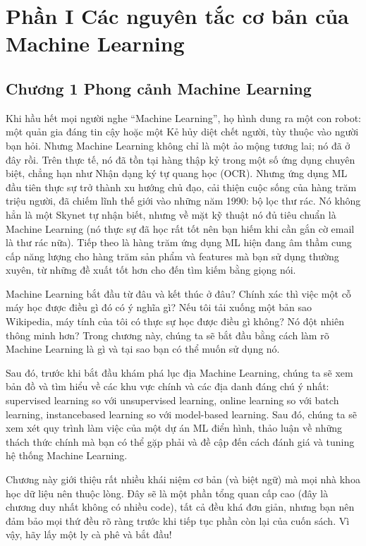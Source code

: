 \section{Phần I Các nguyên tắc cơ bản của Machine Learning}

\subsection{Chương 1 Phong cảnh Machine Learning}

Khi hầu hết mọi người nghe “Machine Learning”, họ hình dung ra một con robot: một quản gia đáng tin cậy hoặc một Kẻ hủy diệt chết người, tùy thuộc vào người bạn hỏi. Nhưng Machine Learning không chỉ là một ảo mộng tương lai; nó đã ở đây rồi. Trên thực tế, nó đã tồn tại hàng thập kỷ trong một số ứng dụng chuyên biệt, chẳng hạn như Nhận dạng ký tự quang học (OCR). Nhưng ứng dụng ML đầu tiên thực sự trở thành xu hướng chủ đạo, cải thiện cuộc sống của hàng trăm triệu người, đã chiếm lĩnh thế giới vào những năm 1990: bộ lọc thư rác. Nó không hẳn là một Skynet tự nhận biết, nhưng về mặt kỹ thuật nó đủ tiêu chuẩn là Machine Learning (nó thực sự đã học rất tốt nên bạn hiếm khi cần gắn cờ email là thư rác nữa). Tiếp theo là hàng trăm ứng dụng ML hiện đang âm thầm cung cấp năng lượng cho hàng trăm sản phẩm và features mà bạn sử dụng thường xuyên, từ những đề xuất tốt hơn cho đến tìm kiếm bằng giọng nói.

Machine Learning bắt đầu từ đâu và kết thúc ở đâu? Chính xác thì việc một cỗ máy học được điều gì đó có ý nghĩa gì? Nếu tôi tải xuống một bản sao Wikipedia, máy tính của tôi có thực sự học được điều gì không? Nó đột nhiên thông minh hơn? Trong chương này, chúng ta sẽ bắt đầu bằng cách làm rõ Machine Learning là gì và tại sao bạn có thể muốn sử dụng nó.

Sau đó, trước khi bắt đầu khám phá lục địa Machine Learning, chúng ta sẽ xem bản đồ và tìm hiểu về các khu vực chính và các địa danh đáng chú ý nhất: supervised learning so với unsupervised learning, online learning so với batch learning, instancebased learning so với model-based learning. Sau đó, chúng ta sẽ xem xét quy trình làm việc của một dự án ML điển hình, thảo luận về những thách thức chính mà bạn có thể gặp phải và đề cập đến cách đánh giá và tuning hệ thống Machine Learning.

Chương này giới thiệu rất nhiều khái niệm cơ bản (và biệt ngữ) mà mọi nhà khoa học dữ liệu nên thuộc lòng. Đây sẽ là một phần tổng quan cấp cao (đây là chương duy nhất không có nhiều code), tất cả đều khá đơn giản, nhưng bạn nên đảm bảo mọi thứ đều rõ ràng trước khi tiếp tục phần còn lại của cuốn sách. Vì vậy, hãy lấy một ly cà phê và bắt đầu!

